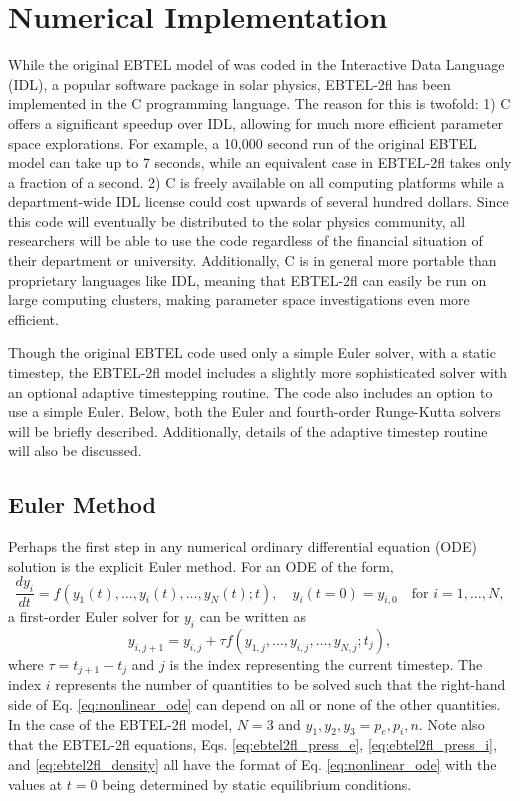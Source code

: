 \section{Numerical Implementation}
\label{sec:numerical}
%
\par While the original EBTEL model of \citet{klimchuk_highly_2008,cargill_enthalpy-based_2012} was coded in the Interactive Data Language (IDL), a popular software package in solar physics, EBTEL-2fl has been implemented in the C programming language. The reason for this is twofold: 1) C offers a significant speedup over IDL, allowing for much more efficient parameter space explorations. For example, a 10,000 second run of the original EBTEL model can take up to 7 seconds, while an equivalent case in EBTEL-2fl takes only a fraction of a second. 2) C is freely available on all computing platforms while a department-wide IDL license could cost upwards of several hundred dollars. Since this code will eventually be distributed to the solar physics community, all researchers will be able to use the code regardless of the financial situation of their department or university. Additionally, C is in general more portable than proprietary languages like IDL, meaning that EBTEL-2fl can easily be run on large computing clusters, making parameter space investigations even more efficient. 
%
\par Though the original EBTEL code used only a simple Euler solver, with a static timestep, the EBTEL-2fl model includes a slightly more sophisticated solver with an optional adaptive timestepping routine. The code also includes an option to use a simple Euler. Below, both the Euler and fourth-order Runge-Kutta solvers will be briefly described. Additionally, details of the adaptive timestep routine will also be discussed.
%
\subsection{Euler Method}
\label{subsec:euler}
%
\par Perhaps the first step in any numerical ordinary differential equation (ODE) solution is the explicit Euler method. For an ODE of the form,
\begin{equation}
	\label{eq:nonlinear_ode}
	\frac{d y_i}{dt} = f(y_1(t),\ldots,y_i(t),\ldots,y_N(t);t),\quad y_i(t=0)=y_{i,0}\quad \text{for }i=1,\ldots,N,
\end{equation}
a first-order Euler solver for $y_i$ can be written as
\begin{equation}
	\label{eq:euler}
	y_{i,j+1} = y_{i,j} + \tau f(y_{1,j},\ldots,y_{i,j},\ldots,y_{N,j};t_j),
\end{equation}
where $\tau=t_{j+1}-t_j$ and $j$ is the index representing the current timestep. The index $i$ represents the number of quantities to be solved such that the right-hand side of Eq. \ref{eq:nonlinear_ode} can depend on all or none of the other quantities. In the case of the EBTEL-2fl model, $N=3$ and $y_1,y_2,y_3=p_e,p_i,n$. Note also that the EBTEL-2fl equations, Eqs. \ref{eq:ebtel2fl_press_e}, \ref{eq:ebtel2fl_press_i}, and \ref{eq:ebtel2fl_density} all have the format of Eq. \ref{eq:nonlinear_ode} with the values at $t=0$ being determined by static equilibrium conditions. 
